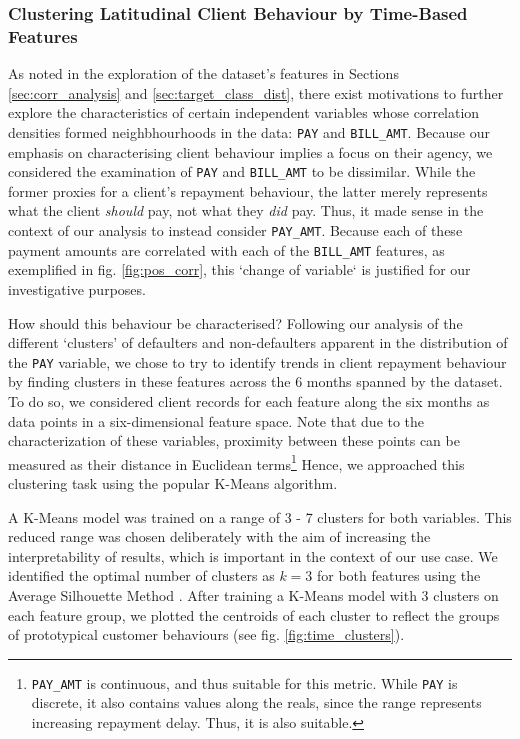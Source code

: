 \documentclass{article}
\newcommand{\code}{\texttt}
\begin{document}
\subsubsection{Clustering Latitudinal Client Behaviour by Time-Based Features}

As noted in the exploration of the dataset’s features in Sections \ref{sec:corr_analysis} and \ref{sec:target_class_dist}, there exist motivations to further explore the characteristics of certain independent variables whose correlation densities formed neighbhourhoods in the data: \code{PAY} and \code{BILL\_AMT}. Because our emphasis on characterising client behaviour implies a focus on their agency, we considered the examination of \code{PAY} and \code{BILL\_AMT} to be dissimilar. While the former proxies for a client’s repayment behaviour, the latter merely represents what the client \textit{should} pay, not what they \textit{did} pay. Thus, it made sense in the context of our analysis to instead consider \code{PAY\_AMT}. Because each of these payment amounts are correlated with each of the \code{BILL\_AMT} features, as exemplified in fig. \ref{fig:pos_corr}, this `change of variable` is justified for our investigative purposes.


How should this behaviour be characterised? Following our analysis of the different `clusters’ of defaulters and non-defaulters apparent in the distribution of the \code{PAY} variable, we chose to try to identify trends in client repayment behaviour by finding clusters in these features across the 6 months spanned by the dataset. To do so, we considered client records for each feature along the six months as data points in a six-dimensional feature space. Note that due to the characterization of these variables, proximity between these points can be measured as their distance in Euclidean terms\footnote{\code{PAY\_AMT} is continuous, and thus suitable for this metric. While \code{PAY} is discrete, it also contains values along the reals, since the range represents increasing repayment delay. Thus, it is also suitable.} Hence, we approached this clustering task using the popular K-Means algorithm. 


A K-Means model was trained on a range of 3 - 7 clusters for both variables. This reduced range was chosen deliberately with the aim of increasing the interpretability of results, which is important in the context of our use case. We identified the optimal number of clusters as $k = 3$ for both features using the Average Silhouette Method \citep{rousseeuw1987silhouettes}. After training a K-Means model with 3 clusters on each feature group, we plotted the centroids of each cluster to reflect the groups of prototypical customer behaviours (see fig. \ref{fig:time_clusters}).
\end{document}
